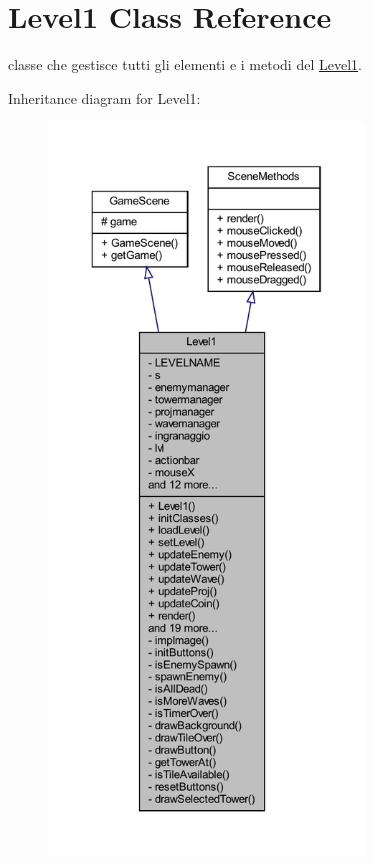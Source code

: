 \hypertarget{classscenes_1_1_level1}{}\section{Level1 Class Reference}
\label{classscenes_1_1_level1}


classe che gestisce tutti gli elementi e i metodi del \hyperlink{classscenes_1_1_level1}{Level1}.  




Inheritance diagram for Level1\+:\nopagebreak
\begin{figure}[H]
\begin{center}
\leavevmode
\includegraphics[height=550pt]{classscenes_1_1_level1__inherit__graph}
\end{center}
\end{figure}


